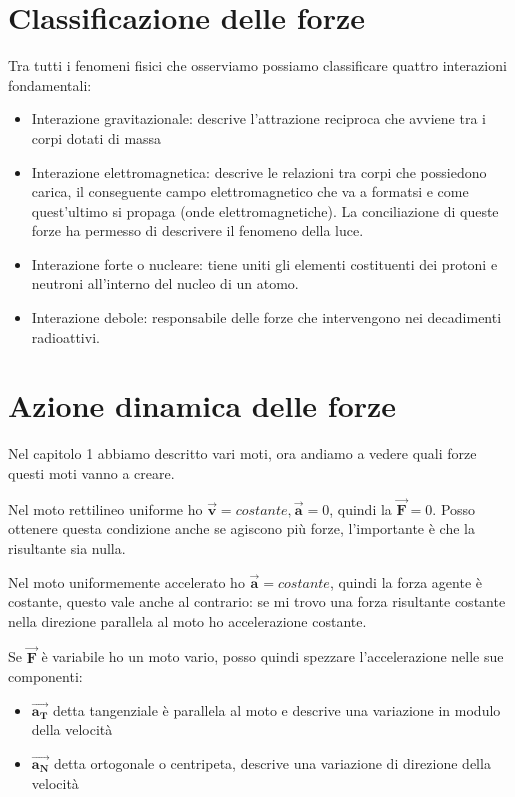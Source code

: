 \documentclass[class=book, crop=false, oneside, 12pt]{standalone}
\begin{document}
\section{Classificazione delle forze}

Tra tutti i fenomeni fisici che osserviamo possiamo classificare quattro interazioni fondamentali:
\begin{itemize}
    \item Interazione gravitazionale: descrive l'attrazione reciproca che avviene tra i corpi dotati di massa
    \item Interazione elettromagnetica: descrive le relazioni tra corpi che possiedono carica, il conseguente campo elettromagnetico che va a formatsi e come quest'ultimo si propaga (onde elettromagnetiche). La conciliazione di queste forze ha permesso di descrivere il fenomeno della luce.
    \item Interazione forte o nucleare: tiene uniti gli elementi costituenti dei protoni e neutroni all'interno del nucleo di un atomo. 
    \item Interazione debole: responsabile delle forze che intervengono nei decadimenti radioattivi.
\end{itemize}

\section{Azione dinamica delle forze}

Nel capitolo 1 abbiamo descritto vari moti, ora andiamo a vedere quali forze questi moti vanno a creare.

Nel moto rettilineo uniforme ho \(\overrightarrow{\mathbf{v}} = costante, \overrightarrow{\mathbf{a}} = 0\), quindi la \(\overrightarrow{\mathbf{F}} = 0\).
Posso ottenere questa condizione anche se agiscono più forze, l'importante è che la risultante sia nulla.

Nel moto uniformemente accelerato ho \(\overrightarrow{\mathbf{a}} = costante\), quindi la forza agente è costante, 
questo vale anche al contrario: se mi trovo una forza risultante costante nella direzione parallela al moto ho accelerazione costante.

Se \(\overrightarrow{\mathbf{F}}\) è variabile ho un moto vario, posso quindi spezzare l'accelerazione nelle sue componenti:
\begin{itemize}
    \item \(\overrightarrow{\mathbf{a_T}}\) detta tangenziale è parallela al moto e descrive una variazione in modulo della velocità
    \item \(\overrightarrow{\mathbf{a_N}}\) detta ortogonale o centripeta, descrive una variazione di direzione della velocità
\end{itemize}
\end{document}

